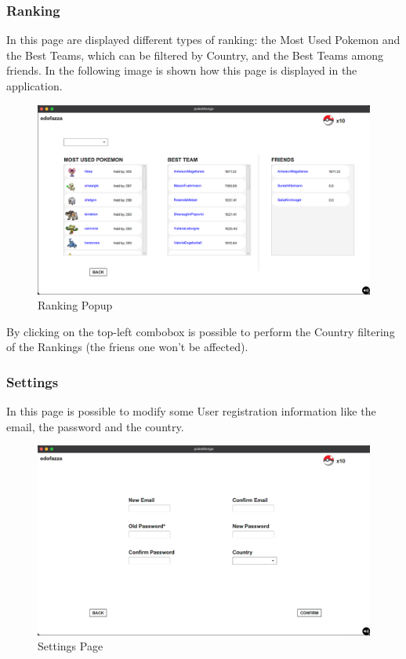 \subsubsection{Ranking}
In this page are displayed different types of ranking: the Most Used Pokemon and the Best Teams, which can be filtered by Country, and the Best Teams among friends. In the following image is shown how this page is displayed in the application.
\begin{figure}[H]
	\centering
	\includegraphics[width=\textwidth]{img/userManual/ranking.png}
	\caption{Ranking Popup}
\end{figure}
By clicking on the top-left combobox is possible to perform the Country filtering of the Rankings (the friens one won't be affected).

\subsubsection{Settings}
In this page is possible to modify some User registration information like the email, the password and the country.
\begin{figure}[H]
	\centering
	\includegraphics[width=\textwidth]{img/userManual/settings.png}
	\caption{Settings Page}
\end{figure}
